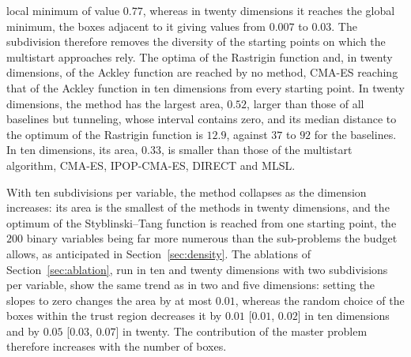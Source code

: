 \documentclass[pdflatex,sn-basic]{sn-jnl}
\begin{document}
local minimum of value $0.77$, whereas in twenty dimensions it reaches the
global minimum, the boxes adjacent to it giving values from $0.007$ to $0.03$.
The subdivision therefore removes the diversity of the starting points on which
the multistart approaches rely. The optima of the Rastrigin function and, in twenty dimensions,
of the Ackley function are reached by no method, CMA-ES reaching that of the
Ackley function in ten dimensions from every starting point. In twenty
dimensions, the method has the largest area, $0.52$, larger than those of all
baselines but tunneling, whose interval contains zero, and its median distance
to the optimum of the Rastrigin function is $12.9$, against $37$ to $92$ for the
baselines. In ten dimensions, its area, $0.33$, is smaller than those of the
multistart algorithm, CMA-ES, IPOP-CMA-ES, DIRECT and MLSL.

With ten subdivisions per variable, the method collapses as the dimension
increases: its area is the smallest of the methods in twenty dimensions, and the
optimum of the Styblinski--Tang function is reached from one starting point, the
$200$ binary variables being far more numerous than the sub-problems the budget
allows, as anticipated in Section~\ref{sec:density}. The ablations of
Section~\ref{sec:ablation}, run in ten and twenty dimensions with two
subdivisions per variable, show the same trend as in two and five dimensions:
setting the slopes to zero changes the area by at most $0.01$, whereas the
random choice of the boxes within the trust region decreases it by $0.01$
[$0.01$, $0.02$] in ten dimensions and by $0.05$ [$0.03$, $0.07$] in twenty. The
contribution of the master problem therefore increases with the number of boxes.
\end{document}
